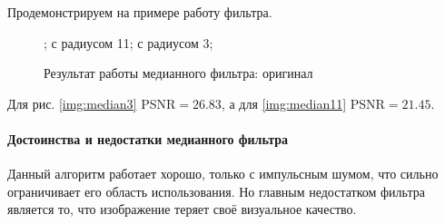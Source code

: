 Продемонстрируем на примере работу фильтра.

\begin{figure}[H]
		\centering
	\hspace{0.0125ex}
\hspace{4ex}
	\caption{Результат работы медианного фильтра: оригинал} ;  с радиусом 11; с радиусом 3;
\end{figure}
Для рис. \ref{img:median3} PSNR$=26.83$, а для \ref{img:median11} PSNR$=21.45$.
\paragraph{Достоинства и недостатки медианного фильтра}
Данный алгоритм работает хорошо, только с импульсным шумом, что сильно ограничивает его область использования. Но главным недостатком фильтра является то, что изображение теряет своё визуальное качество.
